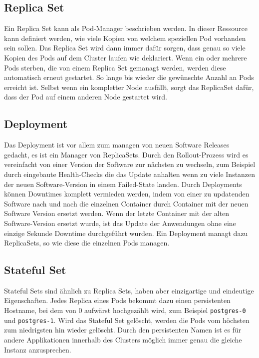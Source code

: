 \subsection{Replica Set}
Ein Replica Set kann als Pod-Manager beschrieben werden. 
In dieser Ressource kann definiert werden, wie viele Kopien von welchem speziellen Pod vorhanden sein sollen.
Das Replica Set wird dann immer dafür sorgen, dass genau so viele Kopien des Pods auf dem Cluster laufen wie deklariert. 
Wenn ein oder mehrere Pods sterben, die von einem Replica Set gemanagt werden, werden diese automatisch erneut gestartet. 
So lange bis wieder die gewünschte Anzahl an Pods erreicht ist.
Selbst wenn ein kompletter Node ausfällt, sorgt das ReplicaSet dafür, dass der Pod auf einem anderen Node gestartet wird.
\cite[S.103 ff.]{Kubernetes_up_and_running}

\subsection{Deployment}
Das Deployment ist vor allem zum managen von neuen Software Releases gedacht, es ist ein Manager von ReplicaSets. 
Durch den Rollout-Prozess wird es vereinfacht von einer Version der Software zur nächsten zu wechseln, zum Beispiel durch eingebaute Health-Checks die das Update anhalten wenn zu viele Instanzen der neuen Software-Version in einem Failed-State landen.
Durch Deployments können Downtimes komplett vermieden werden, indem von einer zu updatenden Software nach und nach die einzelnen Container durch Container mit der neuen Software Version ersetzt werden.
Wenn der letzte Container mit der alten Software-Version ersetzt wurde, ist das Update der Anwendungen ohne eine einzige Sekunde Downtime durchgeführt wurden.
Ein Deployment managt dazu ReplicaSets, so wie diese die einzelnen Pods managen.
\cite[S.113 ff.]{Kubernetes_up_and_running}

\subsection{Stateful Set}
Stateful Sets sind ähnlich zu Replica Sets, haben aber einzigartige und eindeutige Eigenschaften.
Jedes Replica eines Pods bekommt dazu einen persistenten Hostname, bei dem von 0 aufwärst hochgezählt wird, zum Beispiel \texttt{postgres-0} und \texttt{postgres-1}. 
Wird das Stateful Set gelöscht, werden die Pods vom höchsten zum niedrigsten hin wieder gelöscht.
Durch den persistenten Namen ist es für andere Applikationen innerhalb des Clusters möglich immer genau die gleiche Instanz anzusprechen.
\cite[S.186 f.]{Kubernetes_up_and_running}

